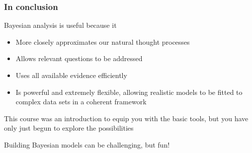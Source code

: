 \documentclass{beamer}
\begin{document}
\begin{frame}
\begin{center}
\end{center}
\end{frame}

\begin{frame}
    \frametitle{In conclusion}
    Bayesian analysis is useful because it\vspace{2mm}
    \begin{itemize}
        \item More closely approximates our natural thought processes\vspace{2mm}
        \item Allows relevant questions to be addressed\vspace{2mm}
        \item Uses all available evidence efficiently\vspace{2mm}
        \item Is powerful and extremely flexible, allowing realistic models to be fitted to complex data sets in a coherent framework\vspace{2mm}
    \end{itemize}
    \pause
    This course was an introduction to equip you with the basic tools, but you have only just begun to explore the possibilities\vspace{4mm}
    \pause
    \centerline{\alert{Building Bayesian models can be challenging, but fun!}}
\end{frame}
\end{document}
